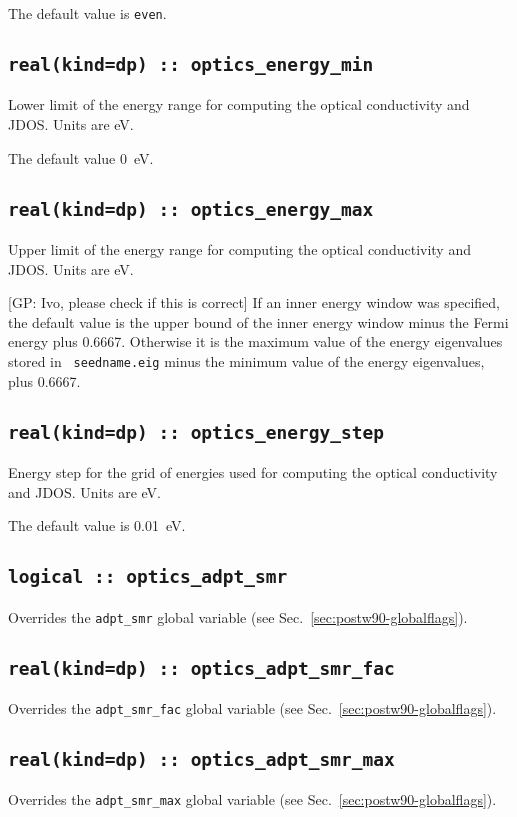 The default value is {\tt even}.


\subsection[optics\_energy\_min]{\tt real(kind=dp) :: optics\_energy\_min}
Lower limit of the energy range for computing the optical conductivity
and JDOS. Units are eV.

The default value 0~eV.

\subsection[optics\_energy\_max]{\tt real(kind=dp) :: optics\_energy\_max}
Upper limit of the energy range for computing the optical conductivity
and JDOS. Units are eV.

{\color{red} [GP: Ivo, please check if this is correct]
If an inner energy window was specified, the default value is the
upper bound of the inner energy window minus the Fermi
  energy plus 0.6667.  Otherwise it is
the maximum value of the energy eigenvalues stored in {\tt
  seedname.eig} minus the minimum value of the energy eigenvalues, plus 0.6667.
}

\subsection[optics\_energy\_step]{\tt real(kind=dp) :: optics\_energy\_step}
Energy step for the grid of energies used for computing the optical
conductivity and JDOS. Units are eV.

The default value is 0.01~eV.

\subsection[optics\_adpt\_smr]{\tt logical :: optics\_adpt\_smr}
Overrides the \verb#adpt_smr# global variable (see
Sec.~\ref{sec:postw90-globalflags}).

\subsection[optics\_adpt\_smr\_fac]{\tt real(kind=dp) ::
  optics\_adpt\_smr\_fac}
Overrides the \verb#adpt_smr_fac# global variable (see
Sec.~\ref{sec:postw90-globalflags}).

\subsection[optics\_adpt\_smr\_max]{\tt real(kind=dp) ::
  optics\_adpt\_smr\_max}
Overrides the \verb#adpt_smr_max# global variable (see
Sec.~\ref{sec:postw90-globalflags}).

